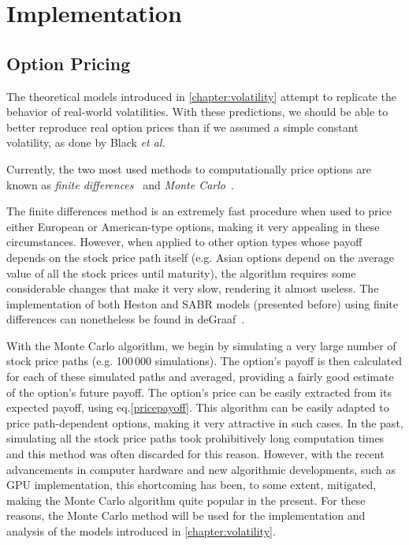 \chapter{Implementation}
\label{chapter:implementation}
\section{Option Pricing}
\label{section:Option Pricing}
The theoretical models introduced in \autoref{chapter:volatility} attempt to replicate the behavior of real-world volatilities. With these predictions, we should be able to better reproduce real option prices than if we assumed a simple constant volatility, as done by Black \textit{et al.}

Currently, the two most used methods to computationally price options are known as \emph{finite differences}~\citep{Hull} and \emph{Monte Carlo}~\citep{Glasserman}.

The finite differences method is an extremely fast procedure when used to price either European or American-type options, making it very appealing in these circumstances. However, when applied to other option types whose payoff depends on the stock price path itself (e.g. Asian options depend on the average value of all the stock prices until maturity), the algorithm requires some considerable changes that make it very slow, rendering it almost useless.
The implementation of both Heston and SABR models (presented before) using finite differences can nonetheless be found in deGraaf~\citep{deGraaf}.


With the Monte Carlo algorithm, we begin by simulating a very large number of stock price paths (e.g. 100\,000 simulations). The option's payoff is then calculated for each of these simulated paths and averaged, providing a fairly good estimate of the option's future payoff. The option's price can be easily extracted from its expected payoff, using eq.\eqref{pricepayoff}. This algorithm can be easily adapted to price path-dependent options, making it very attractive in such cases.
In the past, simulating all the stock price paths took prohibitively long computation times and this method was often discarded for this reason. However, with the recent advancements in computer hardware and new algorithmic developments, such as GPU implementation, this shortcoming has been, to some extent, mitigated, making the Monte Carlo algorithm quite popular in the present.
For these reasons, the Monte Carlo method will be used for the implementation and analysis of the models introduced in \autoref{chapter:volatility}.


